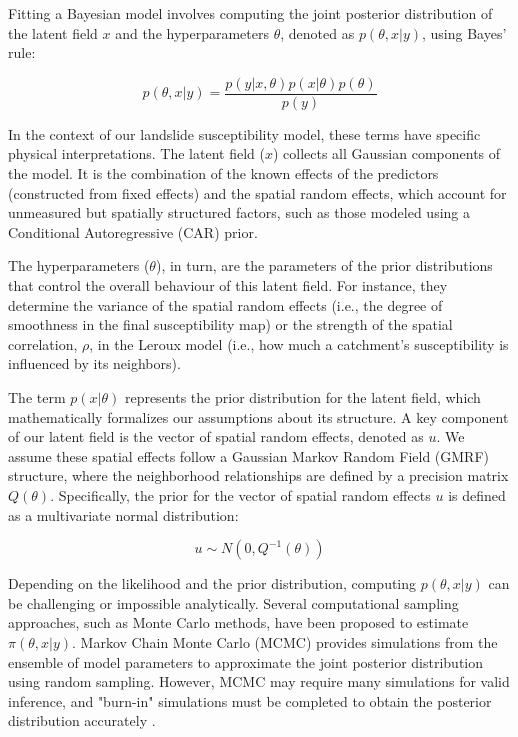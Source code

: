 \documentclass[journal abbreviation, manuscript]{copernicus}
\newcommand{\hlE}[1]{#1}
\begin{document}
Fitting a Bayesian model involves computing the joint posterior distribution of the latent field $x$ and the hyperparameters $\theta$, denoted as $p(\theta, x|y)$, using Bayes' rule:

\begin{equation}
p(\theta,x | y) = \frac{p(y | x,\theta) p(x | \theta) p(\theta)}{p(y)}
\end{equation}

In the context of our landslide susceptibility model, these terms have specific physical interpretations. \hlE{The latent field ($x$) collects all Gaussian components of the model.} It is the combination of the known effects of \hlE{the} predictors (constructed from fixed effects) and the spatial random effects, which account for unmeasured but spatially structured factors, such as those modeled using a Conditional Autoregressive (CAR) prior.

The hyperparameters ($\theta$), in turn, are the parameters of the prior distributions that control the overall behaviour of this latent field. For instance, they determine the variance of the spatial random effects (i.e., the degree of smoothness in the final susceptibility map) or the strength of the spatial correlation, $\rho$, in the Leroux model (i.e., how much a catchment's susceptibility is influenced by its neighbors).

The term $p(x|\theta)$ represents the prior distribution for the latent field, which mathematically formalizes our assumptions about its structure. A key component of our latent field is the vector of spatial random effects, denoted as $u$. We assume these spatial effects follow a Gaussian Markov Random Field (GMRF) structure, where the neighborhood relationships are defined by a precision matrix $Q(\theta)$. Specifically, the prior for the vector of spatial random effects $u$ is defined as a multivariate normal distribution:

\begin{equation}
u \sim N(0,Q^{-1}(\theta))
\end{equation}

Depending on the likelihood and the prior distribution, computing $p(\theta, x|y)$ can be challenging \citep{gallagher2009markov} or impossible analytically. Several computational sampling approaches, such as Monte Carlo methods, have been proposed to estimate $\pi(\theta, x|y)$. Markov Chain Monte Carlo (MCMC) provides simulations from the ensemble of model parameters \citep{brooks1998markov} to approximate the joint posterior distribution using random sampling. However, MCMC may require many simulations for valid inference, and "burn-in" simulations must be completed to obtain the posterior distribution accurately \citep{jones2022markov}.
\end{document}

